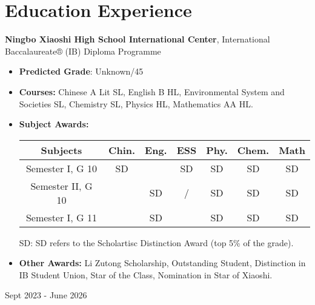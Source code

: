 \documentclass[10pt, letterpaper]{article}
\newenvironment{highlights}{
    \begin{itemize}[
        topsep=0.10 cm,
        parsep=0.10 cm,
        partopsep=0pt,
        itemsep=0pt,
        leftmargin=0.4 cm + 10pt
    ]
}{
    \end{itemize}
} %
\newenvironment{twocolentry}[2][]{
    \onecolentry
    \def\secondColumn{#2}
    \setcolumnwidth{\fill, 4.5 cm}
    \begin{paracol}{2}
}{
    \switchcolumn \raggedleft \secondColumn
    \end{paracol}
    \endonecolentry
} %
\let\hrefWithoutArrow\href
\renewcommand{\href}[2]{\hrefWithoutArrow{#1}{\ifthenelse{\equal{#2}{}}{ }{#2 }\raisebox{.15ex}{\footnotesize \faExternalLink*}}}
\begin{document}
    \section{Education Experience}
        \begin{twocolentry}{ Sept 2023 - June 2026 }
            \textbf{Ningbo Xiaoshi High School International Center}, International Baccalaureate® (IB) Diploma Programme
            \begin{highlights}
                \item \textbf{Predicted Grade}: Unknown/45 %
                \item \textbf{Courses:} Chinese A Lit SL, English B HL, Environmental System and Societies SL, Chemistry SL, Physics HL, Mathematics AA HL.
                \item \textbf{Subject Awards:}
                
                \vspace{0.2cm}
                \begin{tabular}{ c c c c c c c }
                    \hline
                    Subjects & Chin. & Eng. & ESS & Phy. & Chem. & Math \\ \hline
                    Semester I, G 10 & SD &  & SD & SD & SD & SD \\ %
                    Semester II, G 10 &  & SD & / & SD & SD & SD \\ 
                    Semester I, G 11 &  & SD & & SD & SD & SD \\\hline
                \end{tabular}
                \vspace{0.1cm} 
                
                {
                    \small

                SD: SD refers to the Scholartisc Distinction Award (top 5\% of the grade). %
                
                }
                
                \item \textbf{Other Awards:}
                Li Zutong Scholarship, Outstanding Student, Distinction in IB Student Union, Star of the Class, Nomination in Star of Xiaoshi.
                
                
            \end{highlights}
        \end{twocolentry}
\end{document}
